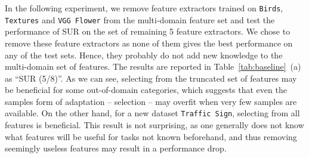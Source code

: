 \documentclass[runningheads]{llncs}
\begin{document}
In the following experiment, we remove feature extractors trained on
\texttt{Birds}, \texttt{Textures} and \texttt{VGG Flower} from the multi-domain
feature set and test the performance of SUR on the set of remaining 5 feature
extractors. We chose to remove these feature extractors as none of them gives
the best performance on any of the test sets. Hence, they probably do not add new
knowledge to the multi-domain set of features. The results are reported in
Table~\ref{tab:baseline}~(a) as ``SUR (5/8)''. As we can see, selecting from the
truncated set of features may be beneficial for some out-of-domain categories,
which suggests that even the samples form of adaptation -- selection -- may
overfit when very few samples are available. On the other hand, for a new
dataset \texttt{Traffic Sign}, selecting from all features is beneficial.
This result is not surprising, as one generally does not know what features will
be useful for tasks not known beforehand, and thus removing seemingly useless
features may result in a performance drop.
\end{document}
